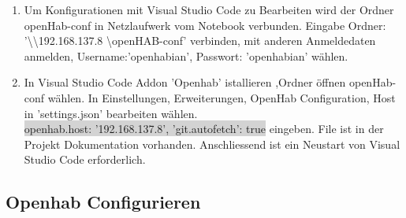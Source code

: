 \begin{enumerate}
\item Um Konfigurationen mit Visual Studio Code zu Bearbeiten wird der Ordner openHab-conf in Netzlaufwerk vom Notebook verbunden. Eingabe Ordner: '\textbackslash \textbackslash 192.168.137.8 \textbackslash openHAB-conf' verbinden, mit anderen Anmeldedaten anmelden, Username:'openhabian', Passwort: 'openhabian' wählen.

\item In Visual Studio Code Addon 'Openhab' istallieren ,Ordner öffnen openHab-conf wählen. In Einstellungen, Erweiterungen, OpenHab Configuration, Host in 'settings.json' bearbeiten wählen. \\
\colorbox{lightgray}{openhab.host: '192.168.137.8',
	'git.autofetch': true} eingeben. File ist in der Projekt Dokumentation vorhanden. Anschliessend ist ein Neustart von Visual Studio Code erforderlich.
   
   
 \end{enumerate}
\subsection{Openhab Configurieren}

